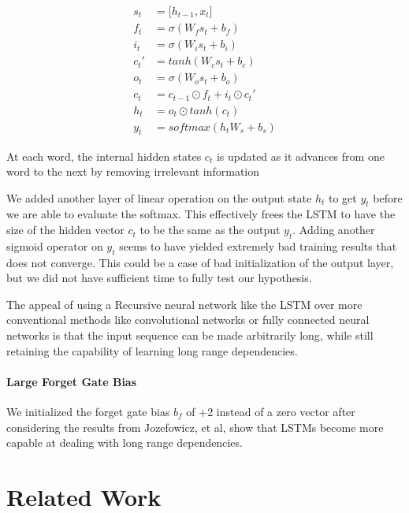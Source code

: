 \documentclass[fyp]{socreport}
\begin{document}
\begin{align*}
  s_t &= \lbrack h_{t-1}, x_{t} \rbrack \\
  f_t &= \sigma \left( W_f s_t + b_f \right) \\
  i_t &= \sigma \left( W_i s_t + b_i \right) \\
  c_t' &= tanh \left( W_c s_t + b_c \right) \\
  o_t &= \sigma \left( W_o s_t + b_o \right) \\
  c_t &= c_{t-1} \odot f_t + i_t \odot c_t' \\
  h_t &= o_t \odot tanh \left( c_t \right) \\
  y_t &= softmax \left( h_t W_s + b_s \right)
\end{align*}

At each word, the internal hidden states $c_t$ is updated as it advances from
one word to the next by removing irrelevant information


We added another layer of linear operation on the output state $h_t$ to get
$y_t$ before we are able to evaluate the softmax. This effectively frees the
LSTM to have the size of the hidden vector $c_t$ to be the same as the output
$y_t$. Adding another sigmoid operator on $y_t$ seems to have yielded extremely
bad training results that does not converge. This could be a case of bad
initialization of the output layer, but we did not have sufficient time to
fully test our hypothesis.

The appeal of using a Recursive neural network like the LSTM over more
conventional methods like convolutional networks or fully connected neural
networks is that the input sequence can be made arbitrarily long, while still
retaining the capability of learning long range dependencies.


\subsubsection{Large Forget Gate Bias}
We initialized the forget gate bias $b_f$ of +2 instead of a zero vector after
considering the results from Jozefowicz, et al\cite{ICML2015JozefowiczZS}, show
that LSTMs become more capable at dealing with long range dependencies.


\chapter{Related Work}
\end{document}

